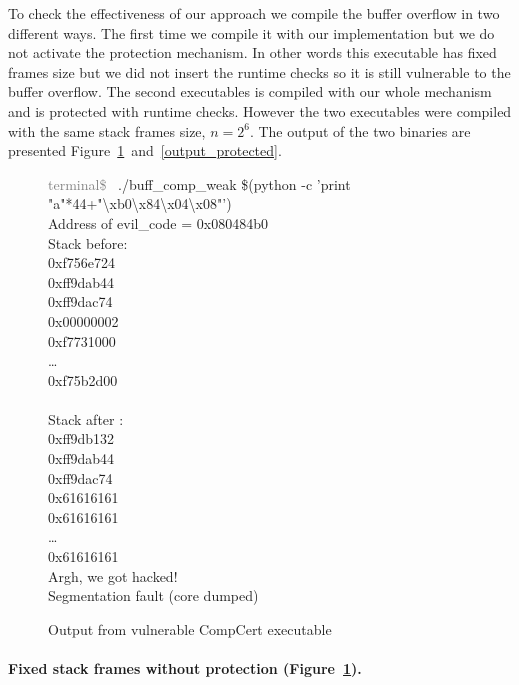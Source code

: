 \documentclass[11pt]{sdm}
\begin{document}
To check the effectiveness of our approach we compile the buffer overflow in two different ways.
The first time we compile it with our implementation but we do not activate the protection mechanism. 
In other words this executable has fixed frames size but we did not insert the runtime checks so it is still vulnerable to the buffer overflow. 
The second executables is compiled with our whole mechanism and is protected with runtime checks.
However the two executables were compiled with the same stack frames size, $n=2^6$.
The output of the two binaries are presented Figure~\ref{output_weak}~and~\ref{output_protected}. 

\begin{figure}[!ht]
\textcolor{gray}{terminal\$~} ./buff\_comp\_weak \$(python -c 'print "a"*44+"\textbackslash{xb0}\textbackslash{x84}\textbackslash{x04}\textbackslash{x08}"')\\
Address of evil\_code = 0x080484b0 \\

Stack before:\\
0xf756e724   \\
0xff9dab44   \\
0xff9dac74   \\
0x00000002   \\
0xf7731000   \\
\dots\\
0xf75b2d00   \\
             \\
Stack after :\\
0xff9db132   \\
0xff9dab44   \\
0xff9dac74   \\
0x61616161   \\
0x61616161   \\
\dots   \\
0x61616161   \\

Argh, we got hacked!\\
Segmentation fault (core dumped)
\caption{Output from vulnerable CompCert executable}
\label{output_weak}
\end{figure}


\paragraph{Fixed stack frames without protection (Figure~\ref{output_weak}).}
\label{par:Fixed stack frames without protection.}
\end{document}
